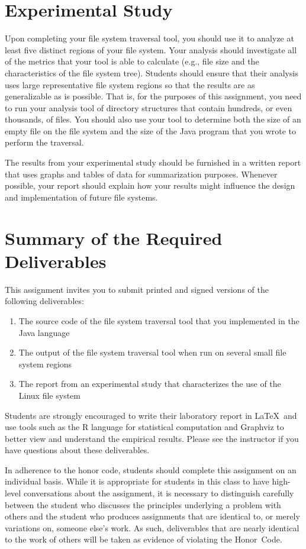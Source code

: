 \section*{Experimental Study}

Upon completing your file system traversal tool, you should use it to analyze at least five distinct regions of your file system.
Your analysis should investigate all of the metrics that your tool is able to calculate (e.g., file size and the characteristics
of the file system tree). Students should ensure that their analysis uses large representative file system regions so that the
results are as generalizable as is possible. That is, for the purposes of this assignment, you need to run your analysis tool of
directory structures that contain hundreds, or even thousands, of files. You should also use your tool to determine both the size
of an empty file on the file system and the size of the Java program that you wrote to perform the traversal.

The results from your experimental study should be furnished in a written report that uses graphs and tables of data for
summarization purposes. Whenever possible, your report should explain how your results might influence the design and
implementation of future file systems.

\section*{Summary of the Required Deliverables}

This assignment invites you to submit printed and signed versions of the following deliverables: 

  \begin{enumerate}
    \item The source code of the file system traversal tool that you implemented in the Java language
    \item The output of the file system traversal tool when run on several small file system regions
    \item The report from an experimental study that characterizes the use of the Linux file system
  \end{enumerate}

Students are strongly encouraged to write their laboratory report in \LaTeX~and use tools such as the R language for statistical
computation and Graphviz to better view and understand the empirical results. Please see the instructor if you have questions
about these deliverables.

In adherence to the honor code, students should complete this assignment on an individual basis. While it is appropriate for
students in this class to have high-level conversations about the assignment, it is necessary to distinguish carefully between the
student who discusses the principles underlying a problem with others and the student who produces assignments that are identical
to, or merely variations on, someone else's work.  As such, deliverables that are nearly identical to the work of others will be
taken as evidence of violating the \mbox{Honor Code}.  



  
